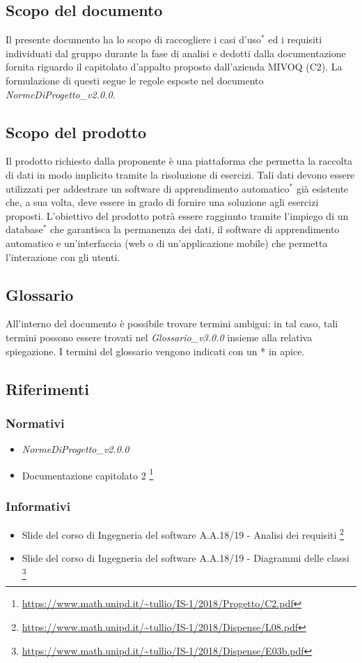 \subsection{Scopo del documento}
	Il presente documento ha lo scopo di raccogliere i casi d'uso$^*$ ed i requisiti individuati dal gruppo durante la fase di analisi e dedotti dalla documentazione fornita riguardo il capitolato d'appalto proposto dall'azienda MIVOQ (C2). La formulazione di questi segue le regole esposte nel documento \textit{NormeDiProgetto\_v2.0.0}.

\subsection{Scopo del prodotto}
	Il prodotto richiesto dalla proponente è una piattaforma che permetta la raccolta di dati in modo implicito tramite la risoluzione di esercizi. Tali dati devono essere utilizzati per addestrare un software di apprendimento automatico$^*$ già esistente che, a sua volta, deve essere in grado di fornire una soluzione agli esercizi proposti. L'obiettivo del prodotto potrà essere raggiunto tramite l'impiego di un database$^*$ che garantisca la permanenza dei dati, il software di apprendimento automatico e un'interfaccia (web o di un'applicazione mobile) che permetta l'interazione con gli utenti.

\subsection{Glossario}
	All'interno del documento è possibile trovare termini ambigui: in tal caso, tali termini possono essere trovati nel \textit{Glossario\_v3.0.0} insieme alla relativa spiegazione. I termini del glossario vengono indicati con un * in apice.
	
\subsection{Riferimenti}
	\subsubsection{Normativi}
	\begin{itemize}
		\item \textit{NormeDiProgetto\_v2.0.0}
		\item Documentazione capitolato 2 \footnote{\url{https://www.math.unipd.it/~tullio/IS-1/2018/Progetto/C2.pdf}}
	
	\end{itemize}
	\subsubsection{Informativi}
	\begin{itemize}
		\item Slide del corso di Ingegneria del software A.A.18/19 - Analisi dei requisiti \footnote{\url{https://www.math.unipd.it/~tullio/IS-1/2018/Dispense/L08.pdf}}
		\item Slide del corso di Ingegneria del software A.A.18/19 - Diagrammi delle classi \footnote{\url{https://www.math.unipd.it/~tullio/IS-1/2018/Dispense/E03b.pdf}}
	\end{itemize}
		